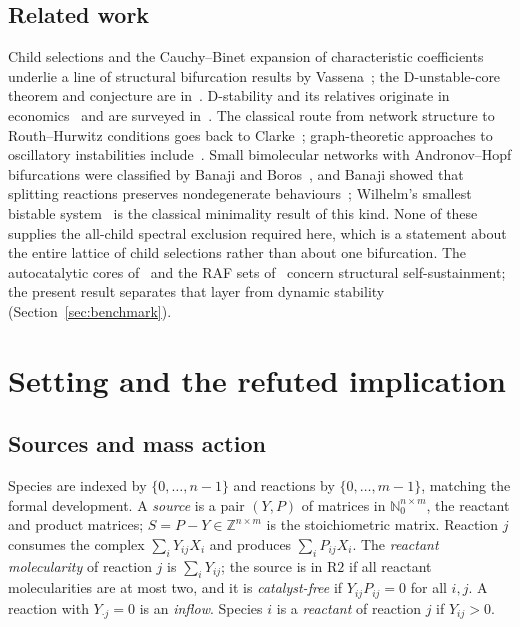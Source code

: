 \documentclass[11pt,a4paper]{article}
\theoremstyle{plain}
\theoremstyle{definition}
\theoremstyle{remark}
\newcommand{\N}{\mathbb{N}}
\newcommand{\Z}{\mathbb{Z}}
\newcommand{\Ract}{\mathrm{R2}}
\begin{document}
\subsection{Related work}

Child selections and the Cauchy--Binet expansion of characteristic coefficients underlie a line of structural bifurcation results by Vassena~\cite{Vassena2023SaddleNode,Vassena2023Symbolic}; the D-unstable-core theorem and conjecture are in~\cite{VassenaStadler2024}. D-stability and its relatives originate in economics~\cite{ArrowMcManus1958,Johnson1974} and are surveyed in~\cite{Cross1978,Hershkowitz1992,Kushel2019}. The classical route from network structure to Routh--Hurwitz conditions goes back to Clarke~\cite{Clarke1980}; graph-theoretic approaches to oscillatory instabilities include~\cite{MinchevaRoussel2007,AngeliBanajiPantea2014}. Small bimolecular networks with Andronov--Hopf bifurcations were classified by Banaji and Boros~\cite{BanajiBoros2023}, and Banaji showed that splitting reactions preserves nondegenerate behaviours~\cite{Banaji2022Splitting}; Wilhelm's smallest bistable system~\cite{Wilhelm2009} is the classical minimality result of this kind. None of these supplies the all-child spectral exclusion required here, which is a statement about the entire lattice of child selections rather than about one bifurcation. The autocatalytic cores of~\cite{BlokhuisLacosteNghe2020} and the RAF sets of~\cite{HordijkSteel2004} concern structural self-sustainment; the present result separates that layer from dynamic stability (Section~\ref{sec:benchmark}).

\section{Setting and the refuted implication}\label{sec:setting}

\subsection{Sources and mass action}

Species are indexed by $\{0,\dots,n-1\}$ and reactions by $\{0,\dots,m-1\}$, matching the formal development. A \emph{source} is a pair $(Y,P)$ of matrices in $\N_0^{n\times m}$, the reactant and product matrices; $S=P-Y\in\Z^{n\times m}$ is the stoichiometric matrix. Reaction $j$ consumes the complex $\sum_iY_{ij}X_i$ and produces $\sum_iP_{ij}X_i$. The \emph{reactant molecularity} of reaction $j$ is $\sum_iY_{ij}$; the source is in $\Ract$ if all reactant molecularities are at most two, and it is \emph{catalyst-free} if $Y_{ij}P_{ij}=0$ for all $i,j$. A reaction with $Y_{\cdot j}=0$ is an \emph{inflow}. Species $i$ is a \emph{reactant} of reaction $j$ if $Y_{ij}>0$.
\end{document}
